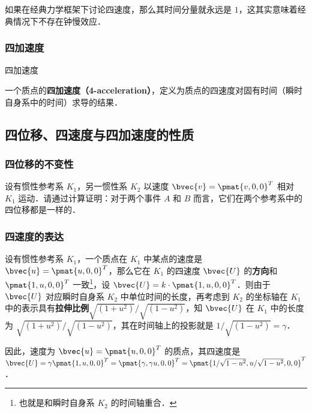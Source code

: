 如果在经典力学框架下讨论四速度，那么其时间分量就永远是 $1$，这其实意味着经典情况下不存在钟慢效应．

\subsubsection{四加速度}

\begin{definition}{四加速度}

一个质点的\textbf{四加速度（4-acceleration）}，定义为质点的四速度对固有时间（瞬时自身系中的时间）求导的结果．

\end{definition}

\subsection{四位移、四速度与四加速度的性质}

\subsubsection{四位移的不变性}

\begin{exercise}{}

设有惯性参考系 $K_1$，另一惯性系 $K_2$ 以速度 $\bvec{v}=\pmat{v, 0, 0}^T$ 相对 $K_1$ 运动．请通过计算证明：对于两个事件 $A$ 和 $B$ 而言，它们在两个参考系中的四位移都是一样的．

\end{exercise}

\subsubsection{四速度的表达}

设有惯性参考系 $K_1$，一个质点在 $K_1$ 中某点的速度是 $\bvec{u}=\pmat{u, 0, 0}^T$，那么它在 $K_1$ 的四速度 $\bvec{U}$ 的\textbf{方向}和 $\pmat{1, u, 0, 0}^T$ 一致\footnote{也就是和瞬时自身系 $K_2$ 的时间轴重合．}，设 $\bvec{U}=k\cdot\pmat{1, u, 0, 0}^T$．则由于 $\bvec{U}$ 对应瞬时自身系 $K_2$ 中单位时间的长度，再考虑到 $K_2$ 的坐标轴在 $K_1$ 中的表示具有\textbf{拉伸比例}$\sqrt{(1+u^2)}/\sqrt{(1-u^2)}$，知 $\bvec{U}$ 在 $K_1$ 中的长度为 $\sqrt{(1+u^2)}/\sqrt{(1-u^2)}$，其在时间轴上的投影就是 $1/\sqrt{(1-u^2)}=\gamma$．

因此，速度为 $\bvec{u}=\pmat{u, 0, 0}^T$ 的质点，其四速度是 $\bvec{U}=\gamma\pmat{1, u, 0, 0}^T=\pmat{\gamma, \gamma u, 0, 0}^T=\pmat{1/\sqrt{1-u^2}, u/\sqrt{1-u^2}, 0, 0}^T$．

